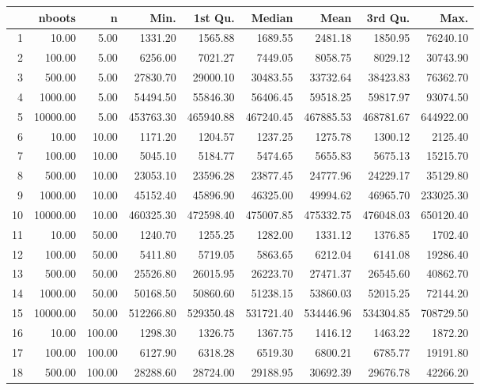 \begin{table}[ht]
\centering
\begin{tabular}{rrrrrrrrr}
  \hline
 & nboots & n & Min. & 1st Qu. & Median & Mean & 3rd Qu. & Max. \\ 
  \hline
1 & 10.00 & 5.00 & 1331.20 & 1565.88 & 1689.55 & 2481.18 & 1850.95 & 76240.10 \\ 
  2 & 100.00 & 5.00 & 6256.00 & 7021.27 & 7449.05 & 8058.75 & 8029.12 & 30743.90 \\ 
  3 & 500.00 & 5.00 & 27830.70 & 29000.10 & 30483.55 & 33732.64 & 38423.83 & 76362.70 \\ 
  4 & 1000.00 & 5.00 & 54494.50 & 55846.30 & 56406.45 & 59518.25 & 59817.97 & 93074.50 \\ 
  5 & 10000.00 & 5.00 & 453763.30 & 465940.88 & 467240.45 & 467885.53 & 468781.67 & 644922.00 \\ 
  6 & 10.00 & 10.00 & 1171.20 & 1204.57 & 1237.25 & 1275.78 & 1300.12 & 2125.40 \\ 
  7 & 100.00 & 10.00 & 5045.10 & 5184.77 & 5474.65 & 5655.83 & 5675.13 & 15215.70 \\ 
  8 & 500.00 & 10.00 & 23053.10 & 23596.28 & 23877.45 & 24777.96 & 24229.17 & 35129.80 \\ 
  9 & 1000.00 & 10.00 & 45152.40 & 45896.90 & 46325.00 & 49994.62 & 46965.70 & 233025.30 \\ 
  10 & 10000.00 & 10.00 & 460325.30 & 472598.40 & 475007.85 & 475332.75 & 476048.03 & 650120.40 \\ 
  11 & 10.00 & 50.00 & 1240.70 & 1255.25 & 1282.00 & 1331.12 & 1376.85 & 1702.40 \\ 
  12 & 100.00 & 50.00 & 5411.80 & 5719.05 & 5863.65 & 6212.04 & 6141.08 & 19286.40 \\ 
  13 & 500.00 & 50.00 & 25526.80 & 26015.95 & 26223.70 & 27471.37 & 26545.60 & 40862.70 \\ 
  14 & 1000.00 & 50.00 & 50168.50 & 50860.60 & 51238.15 & 53860.03 & 52015.25 & 72144.20 \\ 
  15 & 10000.00 & 50.00 & 512266.80 & 529350.48 & 531721.40 & 534446.96 & 534304.85 & 708729.50 \\ 
  16 & 10.00 & 100.00 & 1298.30 & 1326.75 & 1367.75 & 1416.12 & 1463.22 & 1872.20 \\ 
  17 & 100.00 & 100.00 & 6127.90 & 6318.28 & 6519.30 & 6800.21 & 6785.77 & 19191.80 \\ 
  18 & 500.00 & 100.00 & 28288.60 & 28724.00 & 29188.95 & 30692.39 & 29676.78 & 42266.20 \\ 

\end{tabular}
\end{table}
